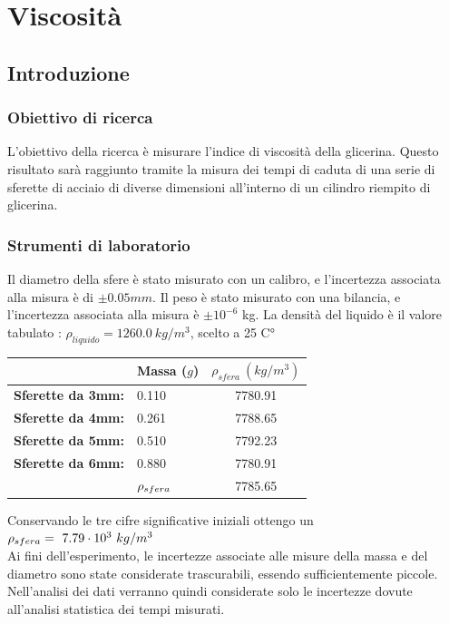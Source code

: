 \chapter{Viscosità}
\section{Introduzione}
\subsection{Obiettivo di ricerca}
L'obiettivo della ricerca è misurare l'indice di viscosità della glicerina. Questo risultato sarà raggiunto tramite la misura dei tempi di caduta di una serie di sferette di acciaio di diverse dimensioni all'interno di un cilindro riempito di glicerina. 

\subsection{Strumenti di laboratorio}
Il diametro della sfere è stato misurato con un calibro, e l'incertezza associata alla misura è di $\pm0.05 mm$. Il peso è stato misurato con una bilancia, e l'incertezza associata alla misura è  $\pm10^{-6}$ kg.
La densità del liquido è il valore tabulato :  $\rho_{liquido} =  1260.0\  kg/m^3 $, scelto a 25 C°
\begin{center}
\begin{tabular}{ll |c}
& Massa ($g$)& $\rho_{sfera} \ (kg/m^3)$\\
\midrule
 \textbf{Sferette da 3mm:}
 & 0.110 & 7780.91 \\
 \midrule
\textbf{Sferette da 4mm: }
 & 0.261 & 7788.65\\
 \midrule
\textbf{Sferette da 5mm: }
 & 0.510 & 7792.23 \\
 \midrule
 \textbf{Sferette da 6mm:}
  & 0.880 & 7780.91\\
  \midrule
  & $\-{\rho_{sfera}}$& 7785.65\\
\end{tabular}
\end{center}
Conservando le tre cifre significative iniziali ottengo un $\-{\rho_{sfera}} = \ 7.79 \cdot 10^3 \ kg/m^3$
\\

Ai fini dell'esperimento, le incertezze associate alle misure della massa e del diametro sono state considerate trascurabili, essendo sufficientemente piccole. Nell'analisi dei dati verranno quindi considerate solo le incertezze dovute all'analisi statistica dei tempi misurati. 
\\

